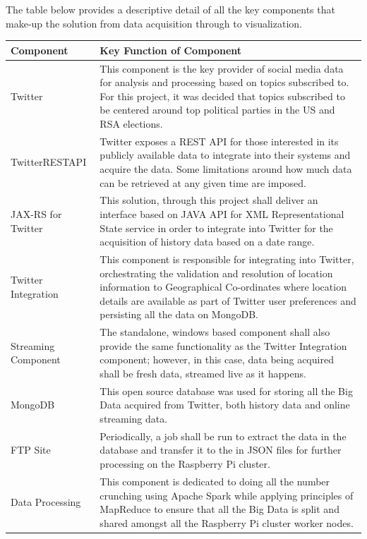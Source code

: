 \documentclass[12pt]{article} %
\begin{document}
	The table below provides a descriptive detail of all the key components that make-up the solution from data acquisition through to visualization.
	\begin{center}
		\begin{tabular}{ | l | p{12.7cm} |}
			\hline     	
			\textbf{Component} & \textbf{Key Function of Component} \\
			\hline
			Twitter & This component is the key provider of social media data for analysis and processing based on topics subscribed to. For this project, it was decided that topics subscribed to be centered around top political parties in the US and RSA elections.\\
			\hline
			TwitterRESTAPI & Twitter exposes a REST API for those interested in its publicly available data to integrate into their systems and acquire the data. Some limitations around how much data can be retrieved at any given time are imposed.\\
			\hline
			JAX-RS for Twitter & This solution, through this project shall deliver an interface based on JAVA API for XML Representational State service in order to integrate into Twitter for the acquisition of history data based on a date range.\\
			\hline
			Twitter Integration & This component is responsible for integrating into Twitter, orchestrating the validation and resolution of location information to Geographical Co-ordinates where location details are available as part of Twitter user preferences and persisting all the data on MongoDB.\\
			\hline
			Streaming Component & The standalone, windows based component shall also provide the same functionality as the Twitter Integration component; however, in this case, data being acquired shall be fresh data, streamed live as it happens.\\
			\hline
			MongoDB & This open source database was used for storing all the Big Data acquired from Twitter, both history data and online streaming data.\\
			\hline
			FTP Site & Periodically, a job shall be run to extract the data in the database and transfer it to the in JSON files for further processing on the Raspberry Pi cluster.\\
			\hline
			Data Processing & This component is dedicated to doing all the number crunching using Apache Spark while applying principles of MapReduce to ensure that all the Big Data is split and shared amongst all the Raspberry Pi cluster worker nodes.\\

\end{tabular}
\end{center}
\end{document}
